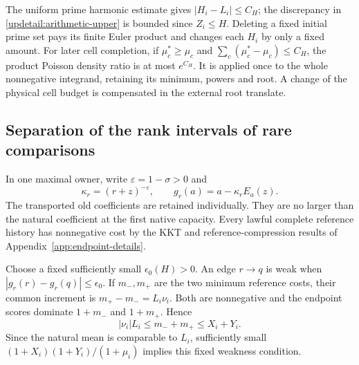 The uniform prime harmonic estimate gives $|H_i-L_i|\leq C_H$;
the discrepancy in \eqref{updetail:arithmetic-upper} is bounded since
$Z_i\leq H$. Deleting a fixed initial prime set pays its finite Euler
product and changes each $H_i$ by only a fixed amount. For later cell
completion, if $\mu_c^*\geq\mu_c$ and
$\sum_c(\mu_c^*-\mu_c)\leq C_H$, the product Poisson density ratio is
at most $e^{C_H}$. It is applied once to the whole nonnegative
integrand, retaining its minimum, powers and root. A change of the
physical cell budget is compensated in the external root translate.

\subsection{Separation of the rank intervals of rare comparisons}
\label{updetail:rank-separation}
In one maximal owner, write $\varepsilon=1-\sigma>0$ and
\[
 \kappa_r=(r+z)^{-\varepsilon},\qquad
 g_r(a)=a-\kappa_rE_a(z).
\]
The transported old coefficients are retained individually. They are
no larger than the natural coefficient at the first native capacity.
Every lawful complete reference history has nonnegative cost by the
KKT and reference-compression results of
Appendix~\ref{app:endpoint-details}.

Choose a fixed sufficiently small $\epsilon_0(H)>0$. An edge $r\to q$
is weak when $|g_r(r)-g_r(q)|\leq\epsilon_0$. If $m_-,m_+$ are the
two minimum reference costs, their common increment is
$m_+-m_-=L_i\nu_i$. Both are nonnegative and the endpoint scores
dominate $1+m_-$ and $1+m_+$. Hence
\[
 |\nu_i|L_i\leq m_-+m_+\leq X_i+Y_i.
\]
Since the natural mean is comparable to $L_i$, sufficiently small
$(1+X_i)(1+Y_i)/(1+\mu_i)$ implies this fixed weakness condition.

